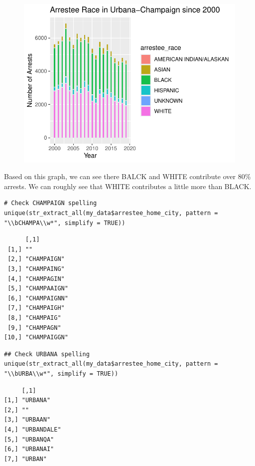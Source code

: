 \documentclass[
  article]{jss}
\begin{document}
\begin{figure}[H]

{\centering \includegraphics{progress-report_files/figure-pdf/unnamed-chunk-7-1.pdf}

}

\end{figure}

Based on this graph, we can see there BALCK and WHITE contribute over
80\% arrests. We can roughly see that WHITE contributes a little more
than BLACK.

\begin{verbatim}
# Check CHAMPAIGN spelling
unique(str_extract_all(my_data$arrestee_home_city, pattern = "\\bCHAMPA\\w*", simplify = TRUE))
\end{verbatim}

\begin{verbatim}
      [,1]        
 [1,] ""          
 [2,] "CHAMPAIGN" 
 [3,] "CHAMPAING" 
 [4,] "CHAMPAGIN" 
 [5,] "CHAMPAAIGN"
 [6,] "CHAMPAIGNN"
 [7,] "CHAMPAIGH" 
 [8,] "CHAMPAIG"  
 [9,] "CHAMPAGN"  
[10,] "CHAMPAIGGN"
\end{verbatim}

\begin{verbatim}
## Check URBANA spelling
unique(str_extract_all(my_data$arrestee_home_city, pattern = "\\bURBA\\w*", simplify = TRUE))
\end{verbatim}

\begin{verbatim}
     [,1]       
[1,] "URBANA"   
[2,] ""         
[3,] "URBAAN"   
[4,] "URBANDALE"
[5,] "URBANQA"  
[6,] "URBANAI"  
[7,] "URBAN"    
\end{verbatim}
\end{document}
